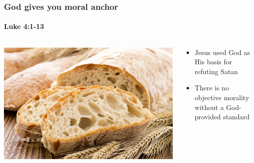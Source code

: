 \begin{frame}
	\frametitle{God gives you moral anchor}
	\framesubtitle{Luke 4:1-13}
	\begin{columns}
	\begin{column}{0.5\textwidth}
	\includegraphics[width=\textwidth]{figures/bread.jpg}
	\end{column}
	\begin{column}{0.5\textwidth}
	\begin{itemize}
	\item Jesus used God as His basis for refuting Satan
	\item There is no objective morality without a God-provided standard
	\end{itemize}
	\end{column}
	\end{columns}
\end{frame}

